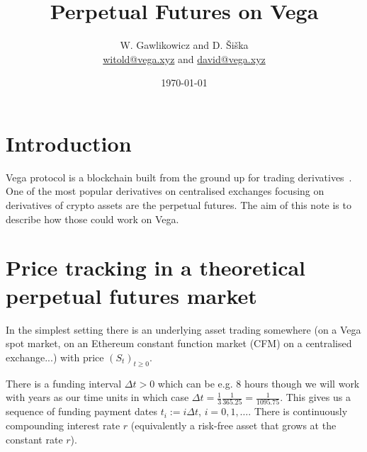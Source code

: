 \documentclass[10pt]{article}
\author{W. Gawlikowicz and D. \v{S}i\v{s}ka\\
\small{\href{witold@vega.xyz}{witold@vega.xyz} and \href{david@vega.xyz}{david@vega.xyz}}}
\title{Perpetual Futures on Vega}
\date{
    \vspace{2em}
    \today\\
    \vspace{0.5em}
    {\footnotesize }
    \vspace{2em}
}
\begin{document}
\thispagestyle{empty} %
\pagestyle{plain}
\lhead[{}{}]       {{}{}}
\rhead[{}{}]       {{}{}}

\maketitle

\tableofcontents
\pagebreak


\pagestyle{fancyplain}
\rhead{\rightmark}
\rfoot{\thepage}
\cfoot{}


\section{Introduction}
Vega protocol is a blockchain built from the ground up for trading derivatives~\cite{vega whitepaper}.
One of the most popular derivatives on centralised exchanges focusing on derivatives of crypto assets are the perpetual futures. 
The aim of this note is to describe how those could work on Vega. 

\section{Price tracking in a theoretical perpetual futures market}

In the simplest setting there is an underlying asset trading somewhere (on a Vega spot market, on an Ethereum constant function market (CFM) on a centralised exchange...) with price $(S_t)_{t\geq 0}$. 

There is a funding interval $\Delta t > 0$ which can be e.g. $8$ hours though we will work with years as our time units in which case $\Delta t = \frac13 \frac1{365.25} = \frac1{1095.75}$.
This gives us a sequence of funding payment dates $t_i := i\Delta t$, $i=0,1,\ldots$.
There is continuously compounding interest rate $r$ (equivalently a risk-free asset that grows at the constant rate $r$).
\end{document}
